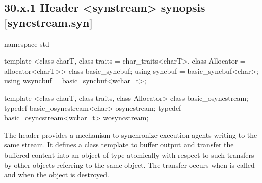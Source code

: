 \documentclass[ebook,11pt,article]{memoir}
\begin{document}
\subsection{30.x.1 Header <synstream> synopsis [syncstream.syn]}
\begin{addedblock}
\begin{codeblock}
namespace std {
template <class charT,
          class traits = char_traits<charT>,
          class Allocator = allocator<charT>>
  class basic_syncbuf;
using syncbuf  = basic_syncbuf<char>;
using wsyncbuf = basic_syncbuf<wchar_t>;

template <class charT,
          class traits,
          class Allocator>
  class basic_osyncstream;
typedef basic_osyncstream<char> osyncstream;
typedef basic_osyncstream<wchar_t> wosyncstream; 
}
\end{codeblock}
\end{addedblock}

\begin{addedblock}
The header  provides a mechanism to synchronize execution agents writing to the same stream. 
It defines a class template  to buffer output and transfer the buffered content into an object of type  atomically with respect to such transfers by other  objects referring to the same  object. The transfer occurs when  is called and when the  object is destroyed.


\end{addedblock}
\end{document}
